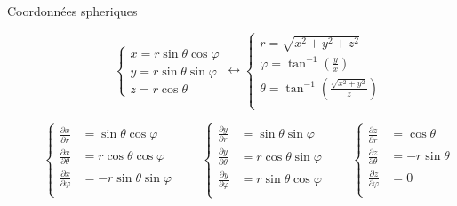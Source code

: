\documentclass
[
a4paper,                      %
twoside,					  %
12pt,                         %
abstract,		      %
fleqn,                        %
]
{scrartcl} %
\begin{document}
\begin{description}
\item[Coordonn\'ees spheriques]

\begin{equation}
\begin{cases}
x=r\sin{\theta}\cos{\varphi}\\
y=r\sin{\theta}\sin{\varphi}\\
z=r\cos{\theta}
\end{cases}\longleftrightarrow\begin{cases}
r=\sqrt{x^{2}+y^{2}+z^{2}}\\
\varphi=\tan^{-1}\left(\frac{y}{x}\right)\\
\theta=\tan^{-1}\left(\frac{\sqrt{x^{2}+y^{2}}}{z}\right)\\
\end{cases}
\end{equation}

\begin{equation}
\begin{cases}
\frac{\partial x}{\partial r}&=\sin{\theta}\cos{\varphi}\\
\frac{\partial x}{\partial \theta}&=r\cos{\theta}\cos{\varphi}\\
\frac{\partial x}{\partial \varphi}&=-r\sin{\theta}\sin{\varphi}\\
\end{cases}\qquad\begin{cases}
\frac{\partial y}{\partial r}&=\sin{\theta}\sin{\varphi}\\
\frac{\partial y}{\partial \theta}&=r\cos{\theta}\sin{\varphi}\\
\frac{\partial y}{\partial \varphi}&=r\sin{\theta}\cos{\varphi}\\
\end{cases}\qquad\begin{cases}
\frac{\partial z}{\partial r}&=\cos{\theta}\\
\frac{\partial z}{\partial \theta}&=-r\sin{\theta}\\
\frac{\partial z}{\partial \varphi}&=0\\
\end{cases}
\end{equation}


\end{description}
\end{document}
